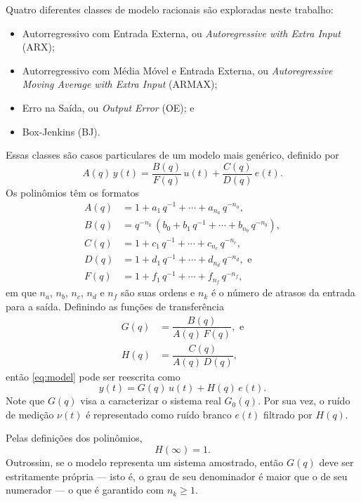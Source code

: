 \documentclass{ppgeesa}
\newcommand{\Prod}{\,}
\begin{document}
Quatro diferentes classes de modelo racionais são exploradas neste trabalho:
\begin{itemize}
  \item Autorregressivo com Entrada Externa, ou \emph{Autoregressive with Extra Input} (ARX);
  \item Autorregressivo com Média Móvel e Entrada Externa, ou \emph{Autoregressive Moving Average with Extra Input} (ARMAX);
  \item Erro na Saída, ou \emph{Output Error} (OE); e
  \item Box-Jenkins (BJ).
\end{itemize}
Essas classes são casos particulares de um modelo mais genérico, definido por
\begin{equation}\label{eq:model}
  A(q) \Prod y(t) = \dfrac{B(q)}{F(q)} \Prod u(t) + \dfrac{C(q)}{D(q)} \Prod e(t)
  .
\end{equation}
Os polinômios têm os formatos
\begin{align}
  A(q) &= 1 + a_1 \Prod q^{-1} + \dotsb + a_{n_a} \Prod q^{-n_a}
  ,
  \\
  B(q) &= q^{-n_k} \Prod \left(b_0 + b_1 \Prod q^{-1} + \dotsb + b_{n_b} \Prod q^{-n_b}\right)
  ,
  \\
  C(q) &= 1 + c_1 \Prod q^{-1} + \dotsb + c_{n_c} \Prod q^{-n_c}
  ,
  \\
  D(q) &= 1 + d_1 \Prod q^{-1} + \dotsb + d_{n_d} \Prod q^{-n_d}
  , \text{ e}
  \\
  F(q) &= 1 + f_1 \Prod q^{-1} + \dotsb + f_{n_f} \Prod q^{-n_f}
  ,
\end{align}
em que $n_a$, $n_b$, $n_c$, $n_d$ e $n_f$ são suas ordens e $n_k$ é o número de atrasos da entrada para a saída.
Definindo as funções de transferência
\begin{align}
  G(q) &= \dfrac{B(q)}{A(q) \Prod F(q)}
  , \text{ e}
  \\
  H(q) &= \dfrac{C(q)}{A(q) \Prod D(q)}
  ,
\end{align}
então \eqref{eq:model} pode ser reescrita como
\begin{equation}\label{eq:model-tf}
  y(t) = G(q) \Prod u(t) + H(q) \Prod e(t)
  .
\end{equation}
Note que $G(q)$ visa a caracterizar o sistema real $G_0(q)$.
Por sua vez, o ruído de medição $\nu(t)$ é representado como ruído branco $e(t)$ filtrado por $H(q)$.

Pelas definições dos polinômios,
\begin{equation}\label{eq:H-inf}
  H(\infty) = 1
  .
\end{equation}
Outrossim, se o modelo representa um sistema amostrado, então $G(q)$ deve ser estritamente própria --- isto é, o grau de seu denominador é maior que o de seu numerador --- o que é garantido com $n_k \geq 1$.
\end{document}
